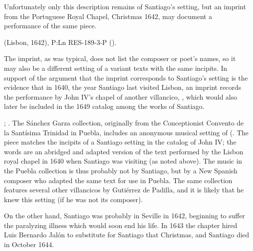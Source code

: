 Unfortunately only this description remains of Santiago's setting, but an
imprint from the Portuguese Royal Chapel, Christmas 1642, may document a
performance of the same piece.%
\begin{Footnote}
     (Lisbon, 1642), P:Ln RES-189-3-P ().
\end{Footnote}
The imprint, as was typical, does not list the composer or poet's names, so it
may also be a different setting of a variant texts with the same incipits.
In support of the argument that the imprint corresponds to Santiago's setting is
the evidence that in 1640, the year Santiago last visited Lisbon, an imprint
records the performance by John IV's chapel of another villancico, , which would also later be included in the 1649 catalog
among the works of Santiago.%
\begin{Footnote}
    ; 
    \autocite[caixão 26, ]{JohnIV:Catalog}.  
    The Sánchez Garza collection, originally from the Conceptionist Convento de
    la Santísima Trinidad in Puebla, includes an anonymous musical setting of
     (.
    The piece matches the incipits of a Santiago setting in the catalog of John
    IV; the words are an abridged and adapted version of the text performed by
    the Lisbon royal chapel in 1640 when Santiago was visiting (as noted above).
    The music in the Puebla collection is thus probably not by Santiago, but by
    a New Spanish composer who adapted the same text for use in Puebla.
    The same collection features several other villancicos by Gutiérrez de
    Padilla, and it is likely that he knew this setting (if he was not its
    composer).
    \end{Footnote}
On the other hand, Santiago was probably in Seville in 1642, beginning to suffer
the paralyzing illness which would soon end his life.
In 1643 the chapter hired Luis Bernardo Jalón to substitute for Santiago that
Christmas, and Santiago died in October 1644.%
    \Autocite{Ezquerro:JalonLB}

